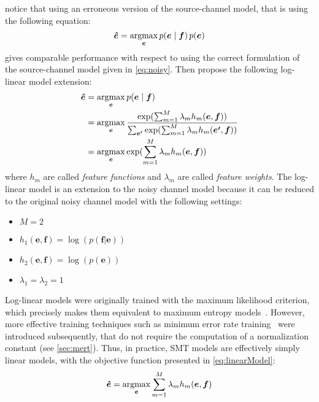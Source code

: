 
\citet{och-tillmann-ney:1999:EMNLP} notice that using an erroneous
version of the source-channel model, that is using the following equation:
%
\begin{equation}
  \bm{\hat{e}} = \operatorname*{argmax}_{\bm{e}} p(\bm{e} \mid \bm{f}) \, p(\bm{e})
\end{equation}
%
gives comparable performance with respect to using the correct
formulation of the source-channel model given in \autoref{eq:noisy}.
Then \citet{och-ney:2002:ACL} propose the following log-linear model extension:
%
\begin{align}
  \bm{\hat{e}} &= \operatorname*{argmax}_{\bm{e}} p(\bm{e} \mid \bm{f}) \nonumber \\
               &= \operatorname*{argmax}_{\bm{e}} \frac{\exp(\sum_{m=1}^M \lambda_m h_m(\bm{e}, \bm{f}))}{\sum_{\bm{e'}}\exp(\sum_{m=1}^M \lambda_m h_m(\bm{e'}, \bm{f}))} \nonumber \\
               &= \operatorname*{argmax}_{\bm{e}} \exp(\sum_{m=1}^M \lambda_m h_m(\bm{e}, \bm{f})) \label{eq:loglinearModel}
\end{align}
%
where $h_m$ are called \emph{feature functions} and $\lambda_m$
are called \emph{feature weights}. The log-linear model is an extension
to the noisy channel model because it can be reduced to the original
noisy channel model with the following settings:
%
    \begin{itemize}
      \item $M = 2$
      \item $h_1(\bm{e}, \bm{f}) = \log (p(\bm{f}|\bm{e}))$
      \item $h_2(\bm{e}, \bm{f}) = \log (p(\bm{e}))$
      \item $\lambda_1 = \lambda_2 = 1$
    \end{itemize}
%
Log-linear models were originally trained with the maximum likelihood
criterion, which precisely makes them equivalent to maximum entropy
models~\citep{berger-dellapietra-dellapietra:1996:CL}. However,
more effective training techniques such as minimum error rate
training~\citep{och:2003:ACL} were introduced subsequently, that do
not require the computation of a normalization constant
(see \autoref{sec:mert}).
Thus, in practice, SMT models are effectively simply linear models, with the objective
function presented in \autoref{eq:linearModel}:
%
\begin{equation}
  \bm{\hat{e}} = \operatorname*{argmax}_{\bm{e}} \sum_{m=1}^M \lambda_m h_m(\bm{e}, \bm{f})
  \label{eq:linearModel}
\end{equation}

